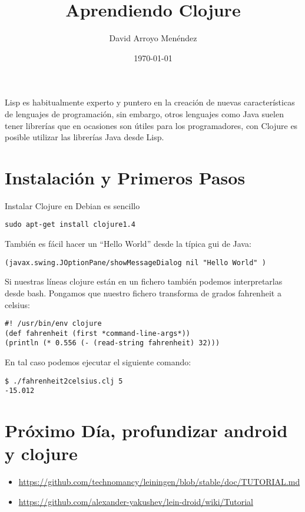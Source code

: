 \documentclass[11pt]{article}
\title{Aprendiendo Clojure}
\author{David Arroyo Menéndez}
\date{\today}
\begin{document}
\maketitle

\setcounter{tocdepth}{3}
\tableofcontents
\vspace*{1cm}

Lisp es habitualmente experto y puntero en la creación de nuevas
características de lenguajes de programación, sin embargo, otros
lenguajes como Java suelen tener librerías que en ocasiones son útiles
para los programadores, con Clojure es posible utilizar las librerías
Java desde Lisp.

\section{Instalación y Primeros Pasos}
\label{sec-1}


Instalar Clojure en Debian es sencillo


\begin{verbatim}
sudo apt-get install clojure1.4
\end{verbatim}

También es fácil hacer un ``Hello World'' desde la típica gui de Java:


\begin{verbatim}
(javax.swing.JOptionPane/showMessageDialog nil "Hello World" )
\end{verbatim}

Si nuestras líneas clojure están en un fichero también podemos
interpretarlas desde bash. Pongamos que nuestro fichero transforma de
grados fahrenheit a celsius:


\begin{verbatim}
#! /usr/bin/env clojure
(def fahrenheit (first *command-line-args*))
(println (* 0.556 (- (read-string fahrenheit) 32)))
\end{verbatim}

En tal caso podemos ejecutar el siguiente comando:


\begin{verbatim}
$ ./fahrenheit2celsius.clj 5
-15.012
\end{verbatim}
\section{Próximo Día, profundizar android y clojure}
\label{sec-2}


\begin{itemize}
\item \href{https://github.com/technomancy/leiningen/blob/stable/doc/TUTORIAL.md}{https://github.com/technomancy/leiningen/blob/stable/doc/TUTORIAL.md}
\item \href{https://github.com/alexander-yakushev/lein-droid/wiki/Tutorial}{https://github.com/alexander-yakushev/lein-droid/wiki/Tutorial}
\end{itemize}
\end{document}
